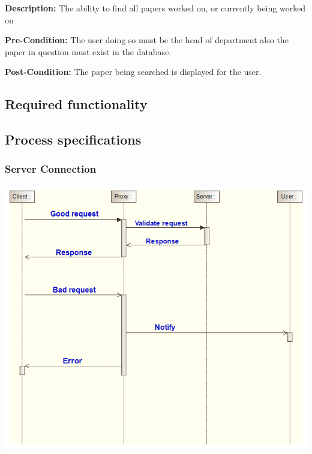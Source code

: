 \documentclass[11pt]{article}
\begin{document}
{\raggedright
	\textbf{Description: }The ability to find all papers worked on, or currently being worked on
}

{\raggedright
	\textbf{Pre-Condition: }The user doing so must be the head of department also the paper in question must exist in the database.
}

{\raggedright
	\textbf{Post-Condition: }The paper being searched is displayed for the user.
}

\subsection{Required functionality}

\newpage

\subsection{Process specifications}

\subsubsection{Server Connection}
\begin{center} 
	\includegraphics[width=\textwidth]{../Images/Server_Connection_Sequence_Diagram.png}\\[0.5cm]
\end{center}

\newpage
\end{document}
